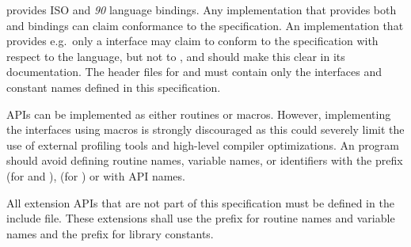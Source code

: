 \openshmem provides ISO \Clang{} and \Fortran{} \textit{90} language bindings.
Any implementation that provides both \Clang{} and \Fortran{} bindings can claim
conformance to the specification. An implementation that provides e.g.\ only a
\Clang{} interface may claim to conform to the \openshmem specification with
respect to the \Clang{} language, but not to \Fortran, and should make this
clear in its documentation. The \openshmem header files for \Clang{} and
\Fortran{} must contain only the interfaces and constant names defined in this
specification.

\openshmem \ac{API}s can be implemented as either routines or macros. However,
implementing the interfaces using macros is strongly discouraged as this could
severely limit the use of external profiling tools and high-level compiler
optimizations. An \openshmem program should avoid defining routine names,
variable names, or identifiers with the prefix \shmemprefix{} (for \Clang{} and
\Fortran), \shmemprefixC{} (for \Clang) or with \openshmem \ac{API} names.

All \openshmem extension \ac{API}s that are not part of this specification must
be defined in the  include file. These extensions shall use the
 prefix for routine names and variable names and the
 prefix for library constants.
